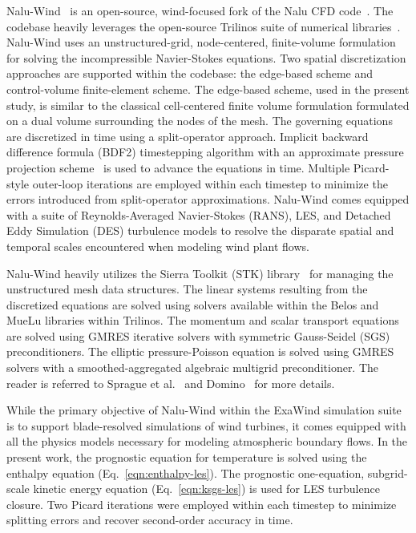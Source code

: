 Nalu-Wind~\cite{SpragueAVR2020} is an open-source, wind-focused fork of the Nalu CFD
code~\cite{Domino:2015}. The codebase heavily leverages the open-source Trilinos
suite of numerical libraries~\cite{Heroux:2003}. Nalu-Wind uses an
unstructured-grid, node-centered, finite-volume formulation for solving the incompressible
Navier-Stokes equations. Two spatial discretization approaches are supported
within the codebase: the edge-based scheme and control-volume finite-element
scheme. The edge-based scheme, used in the present study, is similar to the
classical cell-centered finite volume formulation formulated on a dual volume
surrounding the nodes of the mesh. The governing equations are discretized in
time using a split-operator approach. Implicit backward difference formula
(BDF2) timestepping algorithm with an approximate pressure projection
scheme~\cite{Moen-Domino:2003} is used to advance the equations in time.
Multiple Picard-style outer-loop iterations are employed within each timestep
to minimize the errors introduced from split-operator approximations. Nalu-Wind
comes equipped with a suite of Reynolds-Averaged Navier-Stokes (RANS), LES, and
Detached Eddy Simulation (DES) turbulence models to resolve the disparate
spatial and temporal scales encountered when modeling wind plant flows.

Nalu-Wind heavily utilizes the Sierra Toolkit (STK) library~\cite{Edwards:2010}
for managing the unstructured mesh data structures. The linear systems resulting
from the discretized equations are solved using solvers available within the
Belos and MueLu libraries within Trilinos. The momentum and scalar transport
equations are solved using GMRES iterative solvers with symmetric Gauss-Seidel
(SGS) preconditioners. The elliptic pressure-Poisson equation is solved using
GMRES solvers with a smoothed-aggregated algebraic multigrid preconditioner. The
reader is referred to Sprague et al.~\cite{SpragueAVR2020} and
Domino~\cite{Domino:2015} for more details.

While the primary objective of Nalu-Wind within the ExaWind simulation suite is
to support blade-resolved simulations of wind turbines, it comes equipped
with all the physics models necessary for modeling atmospheric boundary flows.
In the present work, the prognostic equation for temperature is solved using the
enthalpy equation (Eq.~\ref{eqn:enthalpy-les}). The prognostic one-equation,
subgrid-scale kinetic energy equation (Eq.~\ref{eqn:ksgs-les}) is used for LES
turbulence closure. Two Picard iterations were employed within each timestep to
minimize splitting errors and recover second-order accuracy in time.

